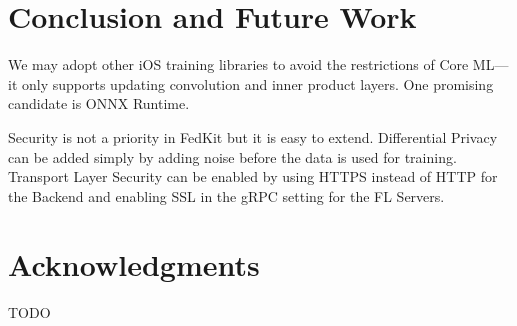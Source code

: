 \documentclass[letterpaper]{article} %
\begin{document}
\section{Conclusion and Future Work}


We may adopt other iOS training libraries to avoid the restrictions of Core
ML---it only supports updating convolution and inner product layers.
One promising candidate is ONNX Runtime.

Security is not a priority in FedKit but it is easy to extend.
Differential Privacy can be added simply by adding noise before the data is
used for training.
Transport Layer Security can be enabled by
using HTTPS instead of HTTP for the Backend and
enabling SSL in the gRPC setting for the FL Servers.

\appendix

\section*{Acknowledgments}
TODO

\bigskip


\end{document}
